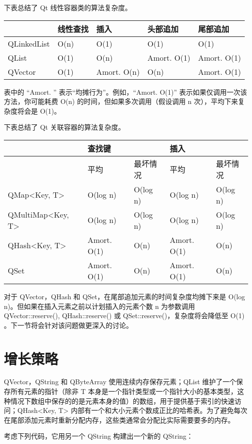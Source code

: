 下表总结了 Qt 线性容器类的算法复杂度。

\begin{tabular}{|l|l|l|l|l|}
\hline
&线性查找	&插入	&头部追加&	尾部追加\\
\hline
QLinkedList&	O(n)&	O(1)&	O(1)&	O(1)\\
\hline
QList&	O(1)&	O(n)&	Amort. O(1)	&Amort. O(1)\\
\hline
QVector&	O(1)&	Amort. O(n)&	O(n)	&Amort. O(1)\\
\hline
\end{tabular}

表中的 “Amort. ” 表示“均摊行为”。例如，“Amort. O(1)” 表示如果仅调用一次该方法，你可能耗费 O(n) 的时间，但如果多次调用（假设调用 n 次），平均下来复杂度将会是 O(1)。

下表总结了 Qt 关联容器的算法复杂度。

\begin{tabular}{|l|l|l|l|l|}
\hline
&查找键	&&	插入&	\\
\hline
&平均&	最坏情况&	平均&	最坏情况\\
\hline
QMap<Key, T>&	O(log n)&	O(log n)&	O(log n)&	O(log n)\\
\hline
QMultiMap<Key, T>&	O(log n)	&O(log n)&	O(log n)&	O(log n)\\
\hline
QHash<Key, T>&	Amort. O(1)&	O(n)&	Amort. O(1)&	O(n)\\
\hline
QSet&	Amort. O(1)&	O(n)	&Amort. O(1)	&O(n)\\
\hline
\end{tabular}

对于 QVector，QHash 和 QSet，在尾部追加元素的时间复杂度均摊下来是 O(log n)。但如果在插入元素之前以计划插入的元素个数 n 为参数调用 QVector::reserve(), QHash::reserve() 或 QSet::reserve()，复杂度将会降低至 O(1) 。下一节将会针对该问题做更深入的讨论。

\splitLine

\section{增长策略}

QVector，QString 和 QByteArray 使用连续内存保存元素；QList 维护了一个保存所有元素的指针（除非 T 本身是一个指针类型或一个指针大小的基本类型，这种情况下数组中保存的的是元素本身的值）的数组，用于提供基于索引的快速访问；QHash<Key, T> 内部有一个和大小元素个数成正比的哈希表。为了避免每次在尾部添加元素时重新分配内存，这些类通常会分配比实际需要要多的内存。

考虑下列代码，它用另一个 QString 构建出一个新的 QString：

